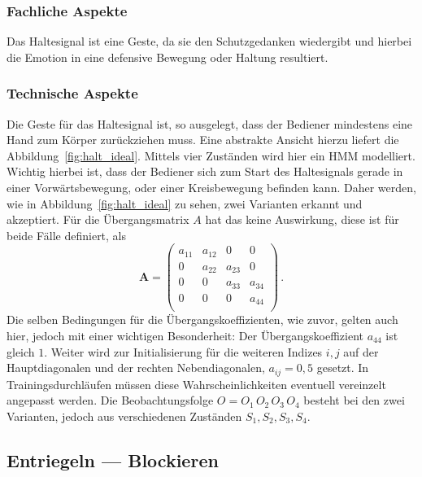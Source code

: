 \subsubsection{Fachliche Aspekte}
Das Haltesignal ist eine  Geste, da sie den Schutzgedanken wiedergibt und hierbei die Emotion in eine defensive Bewegung oder Haltung resultiert. 

\subsubsection{Technische Aspekte}
Die Geste f\"ur das Haltesignal ist, so ausgelegt, dass der Bediener mindestens eine Hand zum K\"orper zur\"uckziehen muss. Eine abstrakte Ansicht hierzu liefert die Abbildung~\ref{fig:halt_ideal}. Mittels vier Zust\"anden wird hier ein \acrshort{HMM} modelliert.
\newline
Wichtig hierbei ist, dass der Bediener sich zum Start des Haltesignals gerade in einer Vorw\"artsbewegung, oder einer Kreisbewegung befinden kann. Daher werden, wie in Abbildung~\ref{fig:halt_ideal} zu sehen, zwei Varianten erkannt und akzeptiert. F\"ur die \"Ubergangsmatrix $A$ hat das keine Auswirkung, diese ist f\"ur beide F\"alle definiert, als
\begin{equation}
\mathbf{A} = 
\begin{pmatrix}
a_{11} & a_{12} & 0 & 0\\
0 & a_{22} & a_{23} & 0\\
0 & 0 & a_{33} & a_{34}\\
0 & 0 & 0 & a_{44} \\
\end{pmatrix} \, .
\end{equation}
Die selben Bedingungen f\"ur die \"Ubergangskoeffizienten, wie zuvor, gelten auch hier, jedoch mit einer wichtigen Besonderheit: Der \"Ubergangskoeffizient $a_{44}$ ist gleich $1$. Weiter wird zur Initialisierung f\"ur die weiteren Indizes $i, j$ auf der Hauptdiagonalen und der rechten Nebendiagonalen, $a_{ij} = 0,5$ gesetzt. In Trainingsdurchl\"aufen m\"ussen diese Wahrscheinlichkeiten eventuell vereinzelt angepasst werden. Die Beobachtungsfolge $O = O_1\, O_2\, O_3\, O_4$ besteht bei den zwei Varianten, jedoch aus verschiedenen Zust\"anden $S_1, S_2, S_3, S_4$.

\subsection{Entriegeln --- Blockieren}
\label{subsec:gesture-lock-unlock}

